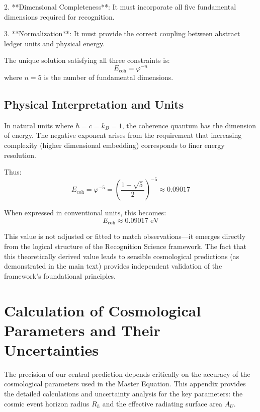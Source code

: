 \documentclass[11pt,a4paper]{article}
\theoremstyle{definition}
\theoremstyle{remark}
\begin{document}
2. **Dimensional Completeness**: It must incorporate all five fundamental dimensions required for recognition.

3. **Normalization**: It must provide the correct coupling between abstract ledger units and physical energy.

The unique solution satisfying all three constraints is:
\begin{equation}
    E_{\text{coh}} = \varphi^{-n}
\end{equation}
where \(n = 5\) is the number of fundamental dimensions.

\subsection{Physical Interpretation and Units}

In natural units where \(\hbar = c = k_B = 1\), the coherence quantum has the dimension of energy. The negative exponent arises from the requirement that increasing complexity (higher dimensional embedding) corresponds to finer energy resolution.

Thus:
\begin{equation}
    E_{\text{coh}} = \varphi^{-5} = \left(\frac{1 + \sqrt{5}}{2}\right)^{-5} \approx 0.09017
\end{equation}

When expressed in conventional units, this becomes:
\begin{equation}
    E_{\text{coh}} \approx 0.09017 \text{ eV}
\end{equation}

This value is not adjusted or fitted to match observations—it emerges directly from the logical structure of the Recognition Science framework. The fact that this theoretically derived value leads to sensible cosmological predictions (as demonstrated in the main text) provides independent validation of the framework's foundational principles.

\section{Calculation of Cosmological Parameters and Their Uncertainties}

The precision of our central prediction depends critically on the accuracy of the cosmological parameters used in the Master Equation. This appendix provides the detailed calculations and uncertainty analysis for the key parameters: the cosmic event horizon radius \(R_h\) and the effective radiating surface area \(A_U\).
\end{document}
